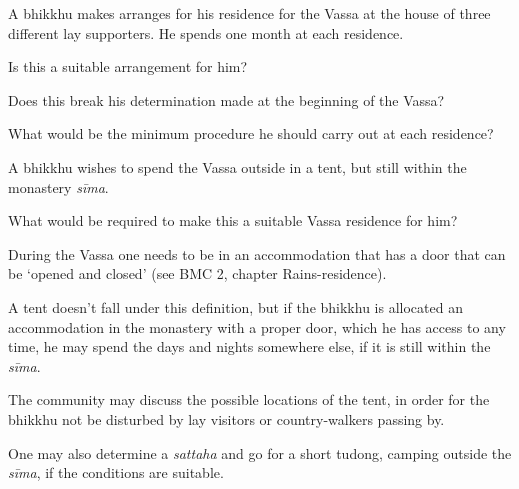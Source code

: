 \bigskip

A bhikkhu makes arranges for his residence for the Vassa at the house of three different lay supporters. He spends one month at each residence.

Is this a suitable arrangement for him?

Does this break his determination made at the beginning of the Vassa?

What would be the minimum procedure he should carry out at each residence?

\bigskip

A bhikkhu wishes to spend the Vassa outside in a tent, but still within the monastery \emph{sīma}.

What would be required to make this a suitable Vassa residence for him?

\begin{solution}
  During the Vassa one needs to be in an accommodation that has a door that can
  be `opened and closed' (see BMC 2, chapter Rains-residence).

  A tent doesn't fall under this definition, but if the bhikkhu is allocated an
  accommodation in the monastery with a proper door, which he has access to any
  time, he may spend the days and nights somewhere else, if it is still within
  the \emph{sīma}.

  The community may discuss the possible locations of the tent, in order for the
  bhikkhu not be disturbed by lay visitors or country-walkers passing by.

  One may also determine a \emph{sattaha} and go for a short tudong, camping
  outside the \emph{sīma}, if the conditions are suitable.
\end{solution}
